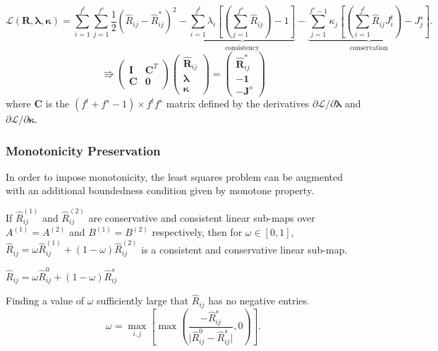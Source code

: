 \documentclass[unknownkeysallowed]{beamer}
\newcommand{\vb}{\mathbf}
\newcommand{\vg}{\boldsymbol}
\begin{document}
\begin{spacing}{1.2}
\begin{frame}
\scriptsize{$$\mathscr{L}(\vb{R}, \vg{\lambda}, \vg{\kappa}) = \sum_{i=1}^{f^t} \sum_{j=1}^{f^s} \frac{1}{2} ( \hat{R}_{ij} - \hat{R}^\ast_{ij} )^2 - \underbrace{\sum_{i=1}^{f^t} \lambda_i \left[ \left( \sum_{j=1}^{f^s} \hat{R}_{ij} \right) - 1 \right]}_{\mbox{consistency}} - \underbrace{\sum_{j=1}^{f^s-1} \kappa_j \left[ \left( \sum_{i=1}^{f^t} \hat{R}_{ij} J_i^t \right) - J_j^s \right]}_{\mbox{conservation}}.$$}
\pause
\scriptsize{$$\vb{\Rrightarrow} \left( \begin{array}{cc} \vb{I} & \vb{C}^T \\ \vb{C} & \vb{0} \end{array} \right) \left( \begin{array}{c} \hat{\vb{R}}_{ij} \\ \vg{\lambda} \\ \vg{\kappa} \end{array} \right) = \left( \begin{array}{c} \hat{\vb{R}}^\ast_{ij} \\ -\vg{1} \\ - \vb{J}^s \end{array} \right)$$}
 where $\vb{C}$ is the $(f^t + f^s - 1) \times f^t f^s$ matrix defined by the derivatives $\partial \mathscr{L} / \partial \vg{\lambda}$ and $\partial \mathscr{L} / \partial \vg{\kappa}$.
\end{frame}

\begin{frame}
\frametitle{Monotonicity Preservation}
In order to impose monotonicity, the least squares problem can be augmented with an  additional boundedness condition given by monotone property.
\pause
\begin{theorem}
   If $\hat{R}^{(1)}_{ij}$ and $\hat{R}^{(2)}_{ij}$ are conservative and consistent linear sub-maps over $A^{(1)} = A^{(2)}$ and $B^{(1)} = B^{(2)}$ respectively,  then for $\omega \in [0,1]$, $\hat{R}_{ij} = \omega \hat{R}^{(1)}_{ij} + (1 - \omega) \hat{R}^{(2)}_{ij}$ is a consistent and conservative linear sub-map.
\end{theorem}

\pause 
\centerline{$\hat{R}_{ij} = \omega \hat{R}^0_{ij} + (1 - \omega) \hat{R}^s_{ij}$}
\pause 
Finding a value of $\omega$ sufficiently large that $\hat{R}_{ij}$ has no negative entries.
$$\omega = \max_{i,j} \left[ \max \left( \frac{- \hat{R}^s_{ij}}{\vert \hat{R}^0_{ij} - \hat{R}^s_{ij} \vert}, 0 \right) \right].$$
\end{frame}




\end{spacing}
\end{document}
